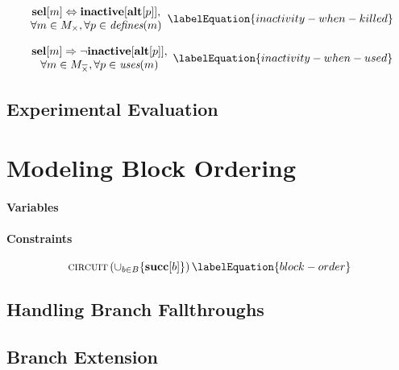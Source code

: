 \begin{equation}
  \begin{array}{c}
    \mVar{sel}[m]
    \mEq
    \mVar{inactive}[\mVar{alt}[p]], \\
    \forall m \in \mMatchSet[\mKill],
    \forall p \in \mDefines(m)
  \end{array}
  \labelEquation{inactivity-when-killed}
\end{equation}

\begin{equation}
  \begin{array}{c}
    \mVar{sel}[m]
    \mImp
    \neg \mVar{inactive}[\mVar{alt}[p]], \\
    \forall m \in \mMatchCompSet{\mKill},
    \forall p \in \mUses(m)
  \end{array}
  \labelEquation{inactivity-when-used}
\end{equation}


\subsection{Experimental Evaluation}




\section{Modeling Block Ordering}

\paragraph{Variables}

\paragraph{Constraints}

\begin{equation}
  \mCircuit\left(
    \cup_{b \in \mBlockSet} \{\mVar{succ}[b]\}
  \right)
  \labelEquation{block-order}
\end{equation}



\subsection{Handling Branch Fallthroughs}

\subsection{Branch Extension}

